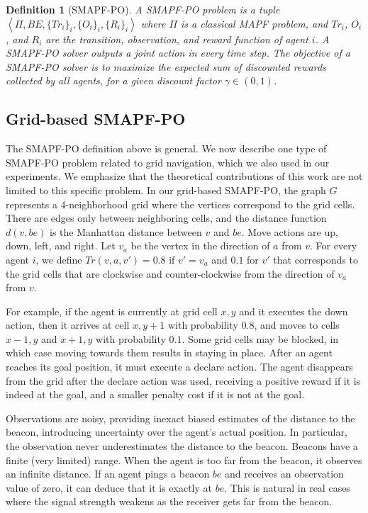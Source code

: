 \documentclass[letterpaper]{article} %
\newcommand{\tuple}[1]{\ensuremath{\left \langle #1 \right \rangle }}
\newcommand{\roni}[1]{ }
\newtheorem{definition}{Definition}
\begin{document}
\begin{definition}[SMAPF-PO]
A SMAPF-PO problem is a tuple $\tuple{\Pi,BE,\{Tr_i\}_i, \{O_i\}_i, \{R_i\}_i}$ where $\Pi$ is a classical MAPF problem, and $Tr_i$, $O_i$, and $R_i$ are the transition, observation, and reward function of agent $i$. 
A SMAPF-PO solver outputs a joint action in every time step. 
The objective of a SMAPF-PO solver is to maximize the expected sum of discounted rewards collected by all agents, for a given discount factor $\gamma\in (0,1)$.  
\end{definition}



\subsection{Grid-based SMAPF-PO}

The SMAPF-PO definition above is general. We now describe one type of SMAPF-PO problem related to grid navigation, which we also used in our experiments. We emphasize that the theoretical contributions of this work are not limited to this specific problem. 
In our grid-based SMAPF-PO, the graph $G$ represents a 4-neighborhood grid where the vertices correspond to the grid cells. There are edges only between neighboring cells, and the distance function $d(v,be)$ is the Manhattan distance between $v$ and $be$. 
Move actions are up, down, left, and right. Let $v_a$ be the vertex in the direction of $a$ from $v$.
For every agent $i$, we define $Tr(v,a,v')=0.8$ if $v'=v_a$ and $0.1$ for $v'$ 
that corresponds to the grid cells that are clockwise and counter-clockwise from the direction of $v_a$ from $v$. 


For example, if the agent is currently at grid cell $x,y$ and it executes the down action, then it arrives at cell $x,y+1$ with probability $0.8$, and moves to cells $x-1,y$ and $x+1,y$ with probability $0.1$.
Some grid cells may be blocked, in which case moving towards them results in staying in place. 
After an agent reaches its goal position, it must execute a declare action. The agent disappears from the grid after the declare action was used, receiving a positive reward if it is indeed at the goal, and a smaller penalty cost if it is not at the goal.  



 
Observations are noisy, providing inexact biased estimates of the distance to the beacon, introducing uncertainty over the agent's actual position. 
In particular, the observation never underestimates the distance to the beacon. Beacons have a finite (very limited) range. When the agent is too far from the beacon, it observes an infinite distance. 
If an agent pings a beacon $be$ and receives an observation value of zero, it can deduce that it is exactly  at $be$. This is natural in real cases where the signal strength weakens as the receiver gets far from the beacon. 
\end{document}
